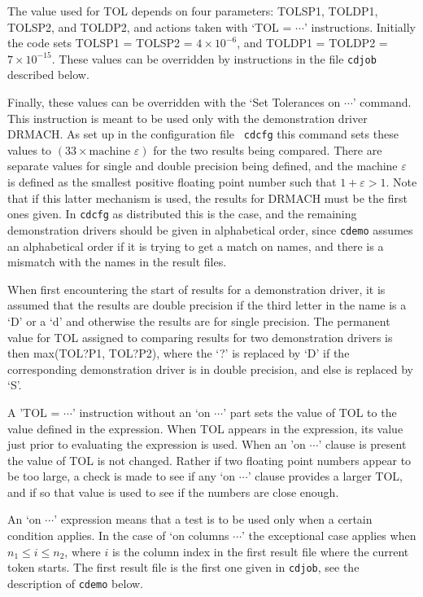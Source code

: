 \documentclass[twoside]{MATH77}
\begin{document}
The value used for TOL depends on four parameters: TOLSP1, TOLDP1, TOLSP2,
and TOLDP2, and actions taken with `TOL = $\cdots$' instructions.
Initially the code sets TOLSP1 = TOLSP2 = $4 \times 10^{-6}$, and TOLDP1 =
TOLDP2 = $7 \times 10^{-15}$.  These values can be overridden by
instructions in the file {\tt cdjob} described below.

Finally, these values can be overridden with the `Set Tolerances on
$\cdots$' command.  This instruction is meant to be used only with the
demonstration driver DRMACH.  As set up in the configuration file {\tt
cdcfg} this command sets these values to $(33 \times \text{machine }
\varepsilon )$ for the two results being compared.  There are separate
values for single and double precision being defined, and the machine
$\varepsilon $ is defined as the smallest positive floating point number
such that $1 + \varepsilon > 1$.  Note that if this latter mechanism is
used, the results for DRMACH must be the first ones given.  In {\tt cdcfg}
as distributed this is the case, and the remaining demonstration drivers
should be given in alphabetical order, since {\tt cdemo} assumes an
alphabetical order if it is trying to get a match on names, and there is a
mismatch with the names in the result files.

When first encountering the start of results for a demonstration driver,
it is assumed that the results are double precision if the third letter in
the name is a `D' or a `d' and otherwise the results are for single
precision.  The permanent value for TOL assigned to comparing results for
two demonstration drivers is then max(TOL?P1, TOL?P2), where the `?' is
replaced by `D' if the corresponding demonstration driver is in double
precision, and else is replaced by `S'.

A 'TOL = $\cdots$' instruction without an `on $\cdots $' part sets the
value
of TOL to the value defined in the expression.  When TOL appears in the
expression, its value just prior to evaluating the expression is used.
When an 'on $\cdots$' clause is present the value of TOL is not changed.
Rather if two floating point numbers appear to be too large, a check is
made to see if any `on $\cdots$' clause provides a larger TOL, and if so
that value is used to see if the numbers are close enough.

An `on $\cdots$' expression means that a test is to be used only when a
certain condition applies.  In the case of `on columns $\cdots$' the
exceptional case applies when $n_1 \leq i \leq n_2$, where $i$ is the
column index in the first result file where the current token starts.  The
first result file is the first one given in {\tt cdjob}, see the
description of {\tt cdemo} below.
\end{document}

